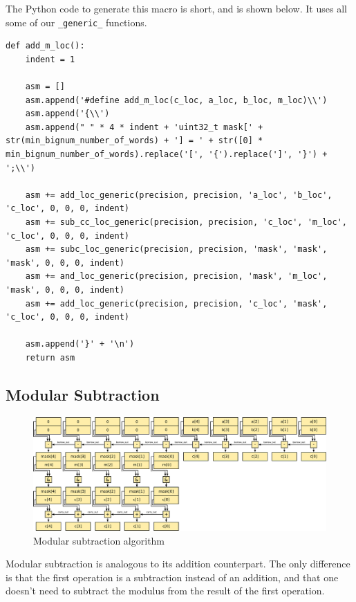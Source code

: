 \documentclass[12pt, a4paper]{report}
\begin{document}
The Python code to generate this macro is short, and is shown below. It uses all
some of our \verb+_generic_+ functions.

\begin{lstlisting}
def add_m_loc():
    indent = 1

    asm = []
    asm.append('#define add_m_loc(c_loc, a_loc, b_loc, m_loc)\\')
    asm.append('{\\')
    asm.append(" " * 4 * indent + 'uint32_t mask[' + str(min_bignum_number_of_words) + '] = ' + str([0] * min_bignum_number_of_words).replace('[', '{').replace(']', '}') + ';\\')

    asm += add_loc_generic(precision, precision, 'a_loc', 'b_loc', 'c_loc', 0, 0, 0, indent)
    asm += sub_cc_loc_generic(precision, precision, 'c_loc', 'm_loc', 'c_loc', 0, 0, 0, indent)
    asm += subc_loc_generic(precision, precision, 'mask', 'mask', 'mask', 0, 0, 0, indent)
    asm += and_loc_generic(precision, precision, 'mask', 'm_loc', 'mask', 0, 0, 0, indent)
    asm += add_loc_generic(precision, precision, 'c_loc', 'mask', 'c_loc', 0, 0, 0, indent)

    asm.append('}' + '\n')
    return asm
\end{lstlisting}

\subsection{Modular Subtraction}
\begin{figure}[h]
\centering
\includegraphics[width=\linewidth]{figs/modular_subtraction}
\caption{Modular subtraction algorithm}
\label{fig:modular_subtraction}
\end{figure}

Modular subtraction is analogous to its addition counterpart.
The only difference is that the first operation is a subtraction instead of
an addition, and that one doesn't need to subtract the modulus from the result
of the first operation.
\end{document}
